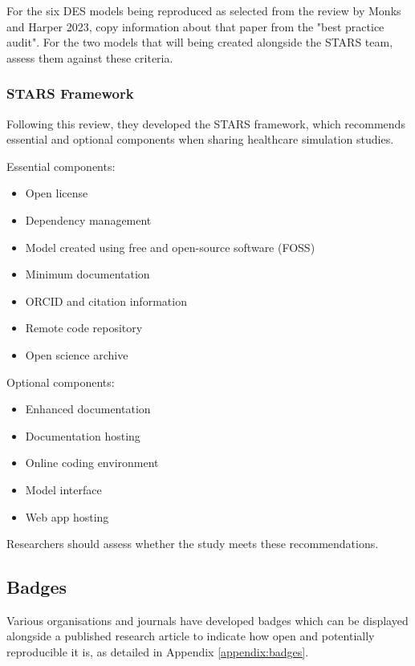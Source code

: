 For the six DES models being reproduced as selected from the review by Monks and Harper 2023,\autocite{monks_computer_2023} copy information about that paper from the "best practice audit". For the two models that will being created alongside the STARS team, assess them against these criteria.

\subsubsection{STARS Framework}

Following this review, they developed the STARS framework, which recommends essential and optional components when sharing healthcare simulation studies.

Essential components:
\begin{itemize}
    \item Open license
    \item Dependency management
    \item Model created using free and open-source software (FOSS)
    \item Minimum documentation
    \item ORCID and citation information
    \item Remote code repository
    \item Open science archive
\end{itemize}

Optional components:
\begin{itemize}
    \item Enhanced documentation
    \item Documentation hosting
    \item Online coding environment
    \item Model interface
    \item Web app hosting
\end{itemize}

Researchers should assess whether the study meets these recommendations.

\subsection{Badges} \label{sec:badges}

Various organisations and journals have developed badges which can be displayed alongside a published research article to indicate how open and potentially reproducible it is, as detailed in Appendix \ref{appendix:badges}.

